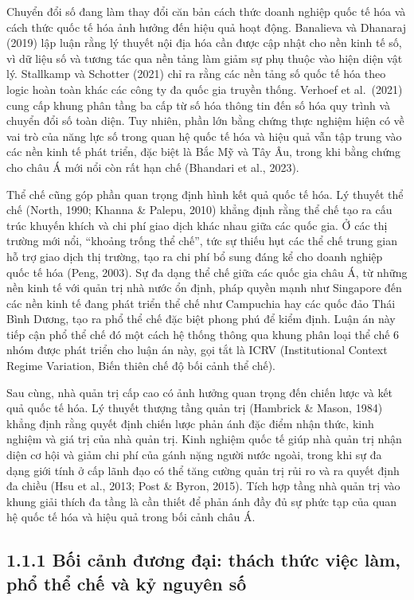 \documentclass[
  a4paper,
  13pt]{extreport}
\begin{document}
Chuyển đổi số đang làm thay đổi căn bản cách thức doanh nghiệp quốc tế
hóa và cách thức quốc tế hóa ảnh hưởng đến hiệu quả hoạt động. Banalieva
và Dhanaraj (2019) lập luận rằng lý thuyết nội địa hóa cần được cập nhật
cho nền kinh tế số, vì dữ liệu số và tương tác qua nền tảng làm giảm sự
phụ thuộc vào hiện diện vật lý. Stallkamp và Schotter (2021) chỉ ra rằng
các nền tảng số quốc tế hóa theo logic hoàn toàn khác các công ty đa
quốc gia truyền thống. Verhoef et al.~(2021) cung cấp khung phân tầng ba
cấp từ số hóa thông tin đến số hóa quy trình và chuyển đổi số toàn diện.
Tuy nhiên, phần lớn bằng chứng thực nghiệm hiện có về vai trò của năng
lực số trong quan hệ quốc tế hóa và hiệu quả vẫn tập trung vào các nền
kinh tế phát triển, đặc biệt là Bắc Mỹ và Tây Âu, trong khi bằng chứng
cho châu Á mới nổi còn rất hạn chế (Bhandari et al., 2023).

Thể chế cũng góp phần quan trọng định hình kết quả quốc tế hóa. Lý
thuyết thể chế (North, 1990; Khanna \& Palepu, 2010) khẳng định rằng thể
chế tạo ra cấu trúc khuyến khích và chi phí giao dịch khác nhau giữa các
quốc gia. Ở các thị trường mới nổi, ``khoảng trống thể chế'', tức sự
thiếu hụt các thể chế trung gian hỗ trợ giao dịch thị trường, tạo ra chi
phí bổ sung đáng kể cho doanh nghiệp quốc tế hóa (Peng, 2003). Sự đa
dạng thể chế giữa các quốc gia châu Á, từ những nền kinh tế với quản trị
nhà nước ổn định, pháp quyền mạnh như Singapore đến các nền kinh tế đang
phát triển thể chế như Campuchia hay các quốc đảo Thái Bình Dương, tạo
ra phổ thể chế đặc biệt phong phú để kiểm định. Luận án này tiếp cận phổ
thể chế đó một cách hệ thống thông qua khung phân loại thể chế 6 nhóm
được phát triển cho luận án này, gọi tắt là ICRV (Institutional Context
Regime Variation, Biến thiên chế độ bối cảnh thể chế).

Sau cùng, nhà quản trị cấp cao có ảnh hưởng quan trọng đến chiến lược và
kết quả quốc tế hóa. Lý thuyết thượng tầng quản trị (Hambrick \& Mason,
1984) khẳng định rằng quyết định chiến lược phản ánh đặc điểm nhận thức,
kinh nghiệm và giá trị của nhà quản trị. Kinh nghiệm quốc tế giúp nhà
quản trị nhận diện cơ hội và giảm chi phí của gánh nặng người nước
ngoài, trong khi sự đa dạng giới tính ở cấp lãnh đạo có thể tăng cường
quản trị rủi ro và ra quyết định đa chiều (Hsu et al., 2013; Post \&
Byron, 2015). Tích hợp tầng nhà quản trị vào khung giải thích đa tầng là
cần thiết để phản ánh đầy đủ sự phức tạp của quan hệ quốc tế hóa và hiệu
quả trong bối cảnh châu Á.

\hypertarget{bux1ed1i-cux1ea3nh-ux111ux1b0ux1a1ng-ux111ux1ea1i-thuxe1ch-thux1ee9c-viux1ec7c-luxe0m-phux1ed5-thux1ec3-chux1ebf-vuxe0-kux1ef7-nguyuxean-sux1ed1}{%
\subsection{1.1.1 Bối cảnh đương đại: thách thức việc làm, phổ thể chế
và kỷ nguyên
số}\label{bux1ed1i-cux1ea3nh-ux111ux1b0ux1a1ng-ux111ux1ea1i-thuxe1ch-thux1ee9c-viux1ec7c-luxe0m-phux1ed5-thux1ec3-chux1ebf-vuxe0-kux1ef7-nguyuxean-sux1ed1}}
\end{document}
